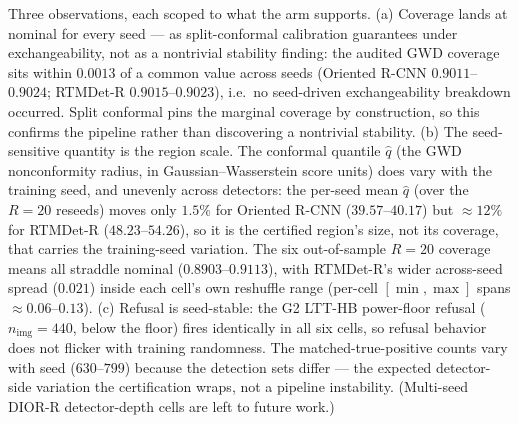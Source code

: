 \documentclass[11pt]{article}
\begin{document}
Three observations, each scoped to what the arm supports. (a) Coverage lands at nominal for every seed
--- as split-conformal calibration guarantees under exchangeability, not as a nontrivial stability finding:
the audited GWD coverage sits within $0.0013$ of a common value across seeds (Oriented R-CNN
$0.9011$--$0.9024$; RTMDet-R $0.9015$--$0.9023$), i.e.\ no seed-driven exchangeability breakdown occurred.
Split conformal pins the marginal coverage by construction, so this confirms the pipeline rather than
discovering a nontrivial stability. (b) The seed-sensitive quantity is the region scale.
The conformal quantile $\hat q$ (the GWD nonconformity radius, in Gaussian--Wasserstein score units)
does vary with the training seed, and unevenly across detectors: the per-seed mean $\hat q$ (over the
$R{=}20$ reseeds) moves only $1.5\%$ for Oriented R-CNN ($39.57$--$40.17$) but $\approx12\%$ for RTMDet-R
($48.23$--$54.26$), so it is the certified region's size, not its coverage, that carries the
training-seed variation. The six out-of-sample $R{=}20$ coverage means all straddle nominal
($0.8903$--$0.9113$), with RTMDet-R's wider across-seed spread ($0.021$) inside each cell's own reshuffle
range (per-cell $[\min,\max]$ spans $\approx0.06$--$0.13$). (c) Refusal is seed-stable: the G2 LTT-HB power-floor refusal
($n_{\mathrm{img}}=440$, below the floor) fires identically in all six cells, so refusal behavior does not
flicker with training randomness. The matched-true-positive counts vary with seed ($630$--$799$) because the
detection sets differ --- the expected detector-side variation the certification wraps, not a pipeline
instability. (Multi-seed DIOR-R detector-depth cells are left to future work.)
\end{document}
